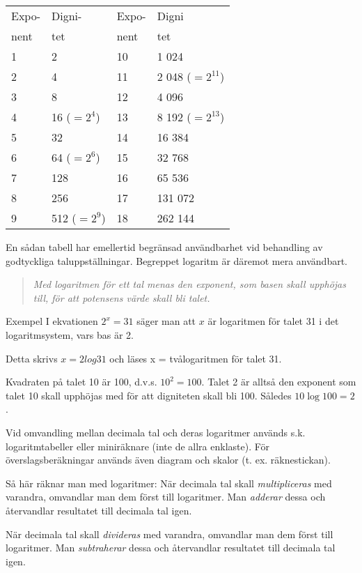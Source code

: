 \begin{tabular}{ll|ll}
Expo- & Digni-       & Expo- & Digni            \\
nent  & tet          & nent  & tet              \\ \hline
1     & 2            & 10    & 1 024            \\
2     & 4            & 11    & 2 048 ($=2^{11}$) \\
3     & 8            & 12    & 4 096            \\
4     & 16 ($=2^4$)  & 13    & 8 192 ($=2^{13}$) \\
5     & 32           & 14    & 16 384           \\
6     & 64 ($=2^6$)  & 15    & 32 768           \\
7     & 128          & 16    & 65 536           \\
8     & 256          & 17    & 131 072          \\
9     & 512 ($=2^9$) & 18    & 262 144
\end{tabular}

En sådan tabell har emellertid begränsad
användbarhet vid behandling av godtyckliga
taluppställningar. Begreppet logaritm är däremot mera användbart.

\begin{quote}\emph{
Med logaritmen för ett tal menas den exponent, som basen skall upphöjas till,
för att potensens värde skall bli talet.
}\end{quote}

Exempel
I ekvationen $2^x = 31$ säger man att $x$ är logaritmen för talet 31 i det
logaritmsystem, vars bas är 2.

Detta skrivs $x= 2log 31$ och läses x = tvålogaritmen för talet 31.

Kvadraten på talet 10 är 100, d.v.s. $10^2 = 100$. Talet 2 är alltså den
exponent som talet 10 skall upphöjas med för att digniteten skall bli 100.
Således $10\log 100 = 2$.

Vid omvandling mellan decimala tal och deras logaritmer används s.k.
logaritmtabeller eller miniräknare (inte de allra enklaste). För
överslagsberäkningar används även diagram och skalor (t. ex. räknestickan).

Så här räknar man med logaritmer:
När decimala tal skall \emph{multipliceras} med varandra, omvandlar man dem
först till logaritmer. Man \emph{adderar} dessa och återvandlar resultatet till
decimala tal igen.

När decimala tal skall \emph{divideras} med varandra, omvandlar man dem först
till logaritmer. Man \emph{subtraherar} dessa och återvandlar resultatet till
decimala tal igen.

